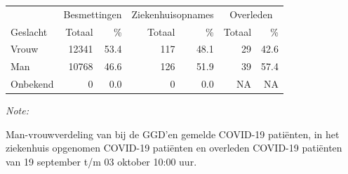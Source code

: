 \documentclass[
  english,
  man,floatsintext]{apa6}
\begin{document}
\begin{table}
\centering\begingroup\fontsize{11}{13}\selectfont

\begin{threeparttable}
\begin{tabular}{lrrrrrr}
\toprule
\multicolumn{1}{c}{ } & \multicolumn{2}{c}{Besmettingen} & \multicolumn{2}{c}{Ziekenhuisopnames} & \multicolumn{2}{c}{Overleden} \\
\cmidrule(l{3pt}r{3pt}){2-3} \cmidrule(l{3pt}r{3pt}){4-5} \cmidrule(l{3pt}r{3pt}){6-7}
Geslacht & Totaal & \% & Totaal & \% & Totaal & \%\\
\midrule
Vrouw & 12341 & 53.4 & 117 & 48.1 & 29 & 42.6\\
Man & 10768 & 46.6 & 126 & 51.9 & 39 & 57.4\\
Onbekend & 0 & 0.0 & 0 & 0.0 & NA & NA\\
\bottomrule
\end{tabular}
\begin{tablenotes}
\item \textit{Note: } 
\item Man-vrouwverdeling van bij de GGD’en gemelde COVID-19 patiënten, in het ziekenhuis opgenomen COVID-19 patiënten en overleden COVID-19 patiënten van 19 september t/m 03 oktober 10:00 uur.
\end{tablenotes}
\end{threeparttable}
\endgroup{}
\end{table}
\newpage
\end{document}
